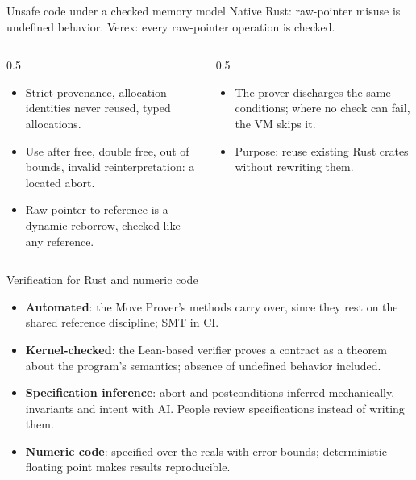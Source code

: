 \documentclass[aspectratio=169,11pt]{beamer}
\begin{document}
\begin{frame}[fragile]{Unsafe code under a checked memory model}
  Native Rust: raw-pointer misuse is undefined behavior. Verex: every raw-pointer operation is checked.
  \medskip
  \begin{columns}[T]
    \begin{column}{0.5\textwidth}
      \begin{itemize}\setlength{\itemsep}{4pt}
        \item Strict provenance, allocation identities never reused, typed allocations.
        \item Use after free, double free, out of bounds, invalid reinterpretation: a located abort.
        \item Raw pointer to reference is a dynamic reborrow, checked like any reference.
      \end{itemize}
    \end{column}
    \begin{column}{0.5\textwidth}
      \begin{itemize}\setlength{\itemsep}{4pt}
        \item The prover discharges the same conditions; where no check can fail, the VM skips it.
        \item Purpose: reuse existing Rust crates without rewriting them.
      \end{itemize}
    \end{column}
  \end{columns}
\end{frame}

\begin{frame}{Verification for Rust and numeric code}
  \begin{itemize}\setlength{\itemsep}{6pt}
    \item \textbf{Automated}: the Move Prover's methods carry over, since they rest on the shared reference discipline; SMT in CI.
    \item \textbf{Kernel-checked}: the Lean-based verifier proves a contract as a theorem about the program's semantics; absence of undefined behavior included.
    \item \textbf{Specification inference}: abort and postconditions inferred mechanically, invariants and intent with AI. People review specifications instead of writing them.
    \item \textbf{Numeric code}: specified over the reals with error bounds; deterministic floating point makes results reproducible.
  \end{itemize}
\end{frame}
\end{document}
